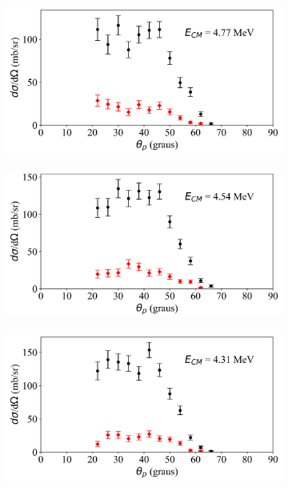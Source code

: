 \documentclass[a4paper,12pt,oneside]{book}
\begin{document}
\begin{figure}[H]
\centering
    \begin{subfigure}[b]{0.48\textwidth}
        \centering
        \includegraphics[scale=0.38, width=1.\columnwidth]{figs/dist_angs/dist_ang_7.png}
        \caption{}
        \label{subfig:dist_ang_h}
    \end{subfigure}%
    \hfill
    \begin{subfigure}[b]{0.49\textwidth}
        \centering
        \includegraphics[scale=0.38, width=1.\columnwidth]{figs/dist_angs/dist_ang_8.png}
        \caption{}
        \label{subfig:dist_ang_i}
    \end{subfigure}
    \begin{subfigure}[b]{0.48\textwidth}
        \centering
        \includegraphics[scale=0.38, width=1.\columnwidth]{figs/dist_angs/dist_ang_9.png}

\end{subfigure}
\end{figure}
\end{document}

